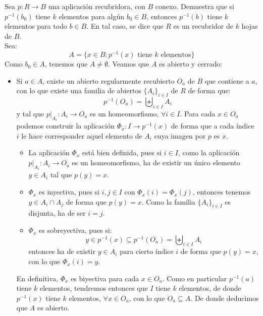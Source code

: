 \begin{ejercicio}
    Sea $p:R\to B$ una aplicación recubridora, con $B$ conexo. Demuestra que si $p^{-1}(b_0)$ tiene $k$ elementos para algún $b_0\in B$, entonces $p^{-1}(b)$ tiene $k$ elementos para todo $b\in B$. En tal caso, se dice que $R$ es un recubridor de $k$ hojas de $B$.\\

    \noindent
    Sea:
    \begin{equation*}
        A = \{x\in B : p^{-1}(x) \text{\ tiene\ } k \text{\ elementos}\}
    \end{equation*}
    Como $b_0 \in A$, tenemos que $A\neq \emptyset $. Veamos que $A$ es abierto y cerrado:
    \begin{itemize}
        \item Si $a\in A$, existe un abierto regularmente recubierto $O_a$ de $B$ que contiene a $a$, con lo que existe una familia de abiertos $\{A_i\}_{i \in I}$ de $R$ de forma que:
            \begin{equation*}
                p^{-1}(O_a) = \biguplus_{i \in I}A_i
            \end{equation*}
            y tal que $p\big|_{A_i}:A_i\to O_a$ es un homeomorfismo, $\forall i \in I$. Para cada $x\in O_a$ podemos construir la aplicación $\Phi_x:I\to p^{-1}(x)$ de forma que a cada índice $i$ le hace corresponder aquel elemento de $A_i$ cuya imagen por $p$ es $x$.
            \begin{itemize}
                \item La aplicación $\Phi_x$ está bien definida, pues si $i \in I$, como la aplicación $p\big|_{A_i}:A_i\to O_a$ es un homeomorfismo, ha de existir un único elemento $y \in A_i$ tal que $p(y) = x$.
                \item $\Phi_x$ es inyectiva, pues si $i,j\in I$ con $\Phi_x(i) = \Phi_x(j)$, entonces tenemos $y\in A_i\cap A_j$ de forma que $p(y) = x$. Como la familia $\{A_i\}_{i \in I}$ es disjunta, ha de ser $i = j$.
                \item $\Phi_x$ es sobreyectiva, pues si:
                    \begin{equation*}
                        y \in p^{-1}(x) \subseteq p^{-1}(O_a) = \biguplus_{i \in I}A_i
                    \end{equation*}
                    entonces ha de existir $y \in A_i$ para cierto índice $i$ de forma que $p(y) = x$, con lo que $\Phi_x(i) = y$.
            \end{itemize}
            En definitiva, $\Phi_x$ es biyectiva para cada $x\in O_a$. Como en particular $p^{-1}(a)$ tiene $k$ elementos, tendremos entonces que $I$ tiene $k$ elementos, de donde $p^{-1}(x)$ tiene $k$ elementos, $\forall x\in O_a$, con lo que $O_a\subseteq A$. De donde deducimos que $A$ es abierto.

\end{itemize}
\end{ejercicio}
